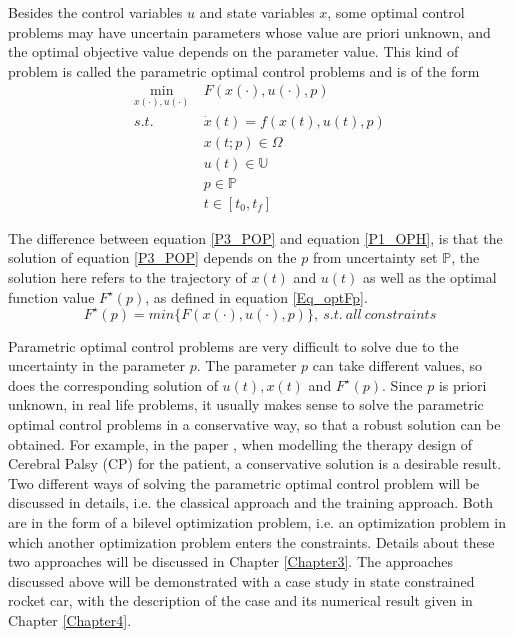 \documentclass  [
  paper    = a4,
  BCOR     = 10mm,
  twoside,
  fontsize = 12pt,
  fleqn,
  toc      = bibnumbered,
  toc      = listofnumbered,
  numbers  = noendperiod,
  headings = normal,
  listof   = leveldown,
  version  = 3.03
]                                       {scrreprt}
\newcommand{\<}{\langle}
\renewcommand{\>}{\rangle}
\begin{document}
Besides the control variables $u$ and state variables $x$, some optimal control problems may have uncertain parameters whose value are priori unknown, and the optimal objective value depends on the parameter value. This kind of problem is called the parametric optimal control problems and is of the form 
      \begin{equation}
	\begin{aligned}
	\underset{x(\cdot), u(\cdot)}{\text{min}}  \ &  F(x(\cdot), u(\cdot), p) \\
	s.t.\ \  &  \dot{x} (t) = f(x(t), u(t),p)\\ 
	& x(t;p) \in \Omega \\
	& u(t) \in \mathbb{U}  \\
	& p  \in   \mathbb{P}  \\
	& t \in [t_0, t_f]
\end{aligned}
\label{P3_POP}
\end{equation}
  
The difference between equation \ref{P3_POP} and equation  \ref{P1_OPH}, is that the solution of equation \ref{P3_POP} depends on the $p$ from uncertainty set $ \mathbb{P}$, the solution here refers to the trajectory of $x(t)$ and $u(t)$ as well as the optimal function value $F^\star(p)$, as defined in equation \ref{Eq_optFp}.
\begin{equation}
	F^\star(p) = min \{ F(x(\cdot), u(\cdot), p) \}, \ s.t. \  all \ constraints
	\label{Eq_optFp}
\end{equation}	

Parametric optimal control problems are very difficult to solve due to the uncertainty in the parameter $p$. The parameter $p$ can take different values, so does the corresponding solution of $u(t), x(t)$ and $F^\star(p)$. Since $p$ is priori unknown, in real life problems, it usually makes sense to solve the parametric optimal control problems in a conservative way, so that a robust solution can be obtained. For example, in the paper \cite{MatSch22}, when modelling the therapy design of Cerebral Palsy (CP) for the patient, a conservative solution is a desirable result. Two different ways of solving the parametric optimal control problem will be discussed in details, i.e. the classical approach and the training approach. Both are in the form of a bilevel optimization problem, i.e. an optimization problem in which another optimization problem enters the constraints. Details about these two approaches will be discussed in Chapter \ref{Chapter3}. The approaches discussed above will be demonstrated with a case study in state constrained rocket car, with the description of the case and its numerical result given in Chapter \ref{Chapter4}.  
\end{document}
